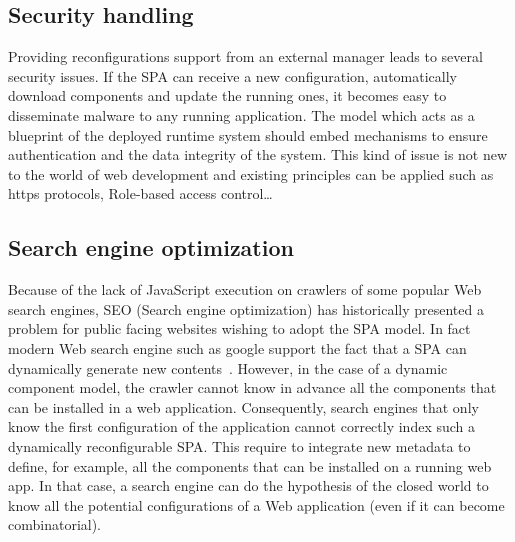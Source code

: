 \subsection{Security handling}
Providing reconfigurations support from an external manager leads to several security issues.
If the SPA can receive a new configuration, automatically download components and update the running ones, it becomes easy to disseminate malware to any running application.
The model which acts as a blueprint of the deployed runtime system should embed mechanisms to ensure authentication and the data integrity of the system.
This kind of issue is not new to the world of web development and existing principles can be applied such as https protocols, Role-based access control\dots

\subsection{Search engine optimization}
Because of the lack of JavaScript execution on crawlers of some popular Web search engines, SEO (Search engine optimization) has historically presented a problem for public facing websites wishing to adopt the SPA model. In fact modern Web search engine such as google support the fact that a SPA can dynamically generate new contents~\cite{googlesearch}. However, in the case of a dynamic component model, the crawler cannot know in advance all the components that can be installed in a web application. Consequently, search engines that only know the first configuration of the application cannot correctly index such a dynamically reconfigurable SPA. This require to integrate new metadata to define, for example, all the components that can be installed on a running web app. In that case, a search engine can do the hypothesis of the closed world to know all the potential configurations of a Web application (even if it can become combinatorial).

